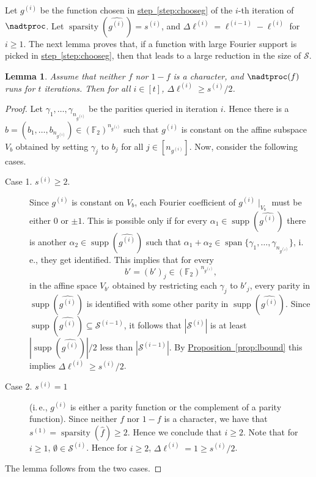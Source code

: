 \documentclass[11pt]{article}
\numberwithin{equation}{section}
\newtheorem{lemma}[theorem]{Lemma}
\theoremstyle{definition}
\theoremstyle{plain}
\newcommand{\ie}{i.\,e.}
\DeclareMathOperator{\Supp}{supp}
\DeclareMathOperator{\spa}{sparsity}
\DeclareMathOperator{\vspan}{span}
\newcommand{\lref}[2][]{\hyperref[#2]{#1~\ref*{#2}}}
\begin{document}
Let $g^{(i)}$ be the function chosen in \lref[step]{step:chooseg} of the
$i$-th iteration of $\nadtproc$. Let $\spa(\widehat{g^{(i)}}) = s^{(i)}$, and $\Delta \ell^{(i)}= \ell^{(i-1)} - \ell^{(i)}$ for $i \geq 1$. The next lemma proves that, if a function with large Fourier support is picked in \lref[step]{step:chooseg}, then that leads to a large reduction in
the size of $\mathcal{S}$.
\begin{lemma}
\label{lem:reduction}
Assume that neither $f$ nor $1-f$ is a character, and $\nadtproc(f)$ runs for $t$ iterations. Then for all $i\in [t]$, $\Delta \ell^{(i)} \geq {s^{(i)}}/{2}$.
\end{lemma}
\begin{proof}
  Let $\gamma_1,\ldots,\gamma_{n_{g^{(i)}}}$ be the parities queried
  in iteration $i$.  Hence there is a
  $b=(b_1,\ldots,b_{n_{g^{(i)}}}) \in
  \left(\mathbb{F}_2\right)^{n_{g^{(i)}}}$ such that $g^{(i)}$ is
  constant on the affine subspace $V_b$ obtained by setting $\gamma_j$
  to $b_j$ for all $j \in [n_{g^{(i)}}]$. Now, consider the following
  cases.
  \begin{description}
   \item [Case 1. $s^{(i)} \geq 2$.]  %
  Since $g^{(i)}$ is
  constant on $V_b$, each Fourier coefficient of $g^{(i)}\mid_{V_b}$ must be either $0$ or $\pm 1$. This is possible only if for every $\alpha_1 \in \Supp(\widehat{g^{(i)}})$ there is another $\alpha_2 \in \Supp(\widehat{g^{(i)}})$ such that $\alpha_1+\alpha_2 \in \vspan \{\gamma_1, \ldots, \gamma_{n_{g^{(i)}}}\}$, \ie, they get identified. This implies that for every
  \[
    b' =(b')_j \in
    \left(\mathbb{F}_2\right)^{n_{g^{(i)}}},
  \]
  in the affine space $V_{b'}$ obtained by restricting each $\gamma_j$
  to $b'_j$, every parity in $\Supp(\widehat{g^{(i)}})$ is identified
  with some other parity in $\Supp(\widehat{g^{(i)}})$. Since
  $\Supp(\widehat{g^{(i)}}) \subseteq \mathcal{S}^{(i-1)}$, it follows
  that $|\mathcal{S}^{(i)}|$ is at least
  $|\Supp(\widehat{g^{(i)}})|/{2}$ less than
  $|\mathcal{S}^{(i-1)}|$. By \lref[Proposition]{prop:lbound} this
  implies $\Delta \ell^{(i)} \geq {s^{(i)}}/{2}$.
%
 \item [Case 2. $s^{(i)}=1$]   %
(\ie, %
$g^{(i)}$ is either a parity function or the complement of a parity function). Since neither $f$ nor $1-f$ is a character, we have that $s^{(1)}=\spa(\widehat{f}) \geq 2$. Hence we conclude that $i \geq 2$. Note that for $i \geq 1$, $\emptyset \in \mathcal{S}^{(i)}$. Hence for $i \geq 2$, $\Delta \ell^{(i)}=1 \geq {s^{(i)}}/{2}$.
  \end{description}
The lemma follows from the two cases.
\end{proof}
\end{document}
